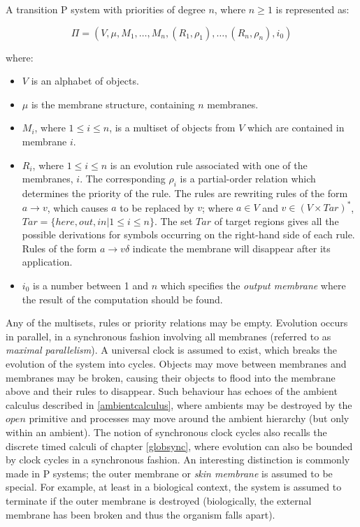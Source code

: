 A transition P system with priorities \cite{paun:98membranes} of
degree $n$, where $n \ge 1$ is represented as:

\begin{equation}
\Pi = (V, \mu, M_1, \dots, M_n,(R_1,\rho_1), \dots, (R_n,\rho_n),i_0)
\end{equation}

\noindent where:

\begin{itemize}
\item $V$ is an alphabet of objects.
\item $\mu$ is the membrane structure, containing $n$ membranes.
\item $M_i$, where $1 \le i \le n$, is a multiset of objects from $V$
      which are contained in membrane $i$.
\item $R_i$, where $1 \le i \le n$ is an evolution rule associated
  with one of the membranes, $i$. The corresponding $\rho_i$ is a
  partial-order relation which determines the priority of the rule.
  The rules are rewriting rules of the form $a \rightarrow v$, which
  causes $a$ to be replaced by $v$; where $a \in V$ and $v \in (V
  \times Tar)^*$, $Tar = \{here, out, in | 1 \le i \le n\}$.  The set
  $Tar$ of target regions gives all the possible derivations for
  symbols occurring on the right-hand side of each rule.  Rules of the
  form $a \rightarrow v\delta$ indicate the membrane will disappear
  after its application.
\item $i_0$ is a number between 1 and $n$ which specifies the
  \emph{output membrane} where the result of the computation should be
  found.
\end{itemize}

\noindent Any of the multisets, rules or priority relations may be
empty.  Evolution occurs in parallel, in a synchronous fashion
involving all membranes (referred to as \emph{maximal parallelism}).
A universal clock is assumed to exist, which breaks the evolution of
the system into cycles.  Objects may move between membranes and
membranes may be broken, causing their objects to flood into the
membrane above and their rules to disappear.  Such behaviour has
echoes of the ambient calculus described in \ref{ambientcalculus},
where ambients may be destroyed by the $open$ primitive and processes
may move around the ambient hierarchy (but only within an ambient).
The notion of synchronous clock cycles also recalls the discrete timed
calculi of chapter \ref{globsync}, where evolution can also be bounded
by clock cycles in a synchronous fashion.  An interesting distinction
is commonly made in P systems; the outer membrane or \emph{skin
  membrane} is assumed to be special.  For example, at least in a
biological context, the system is assumed to terminate if the outer
membrane is destroyed (biologically, the external membrane has been
broken and thus the organism falls apart).


